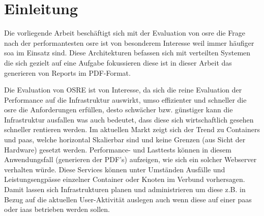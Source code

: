\documentclass[main.tex]{subfiles}
\begin{document}

\chapter{Einleitung}





Die vorliegende Arbeit beschäftigt sich mit der Evaluation von \gls{osre} die Frage nach der performantesten \gls{osre} ist von besonderem Interesse weil immer häufiger \gls{soa} im Einsatz sind.  Diese Architekturen befassen sich mit verteilten Systemen die sich gezielt auf eine Aufgabe fokussieren diese ist in dieser Arbeit das generieren von Reports im PDF-Format.




Die Evaluation von OSRE ist von Interesse, da sich die reine Evaluation der Performance auf die Infrastruktur auswirkt, umso effizienter und schneller die \gls{osre} die Anforderungen erfüllen, desto schwächer bzw. günstiger kann die Infrastruktur ausfallen was auch bedeutet, dass diese sich wirtschaftlich gesehen schneller rentieren werden. Im aktuellen Markt zeigt sich der Trend zu Containers und \acrfull{paas}, welche horizontal Skalierbar sind und keine Grenzen (aus Sicht der Hardware) gesetzt werden.  Performance- und Lasttests  können in diesem Anwendungsfall (generieren der PDF's) aufzeigen, wie sich ein solcher Webserver verhalten würde. Diese Services können unter Umständen Ausfälle und Leistungsengpässe einzelner Container oder Knoten im Verbund vorhersagen. Damit lassen sich Infrastrukturen planen und administrieren um diese z.B. in Bezug auf die aktuellen User-Aktivität auslegen auch wenn diese auf einer \acrlong{paas} oder \acrfull{iaas} betrieben werden sollen. 
\end{document}
